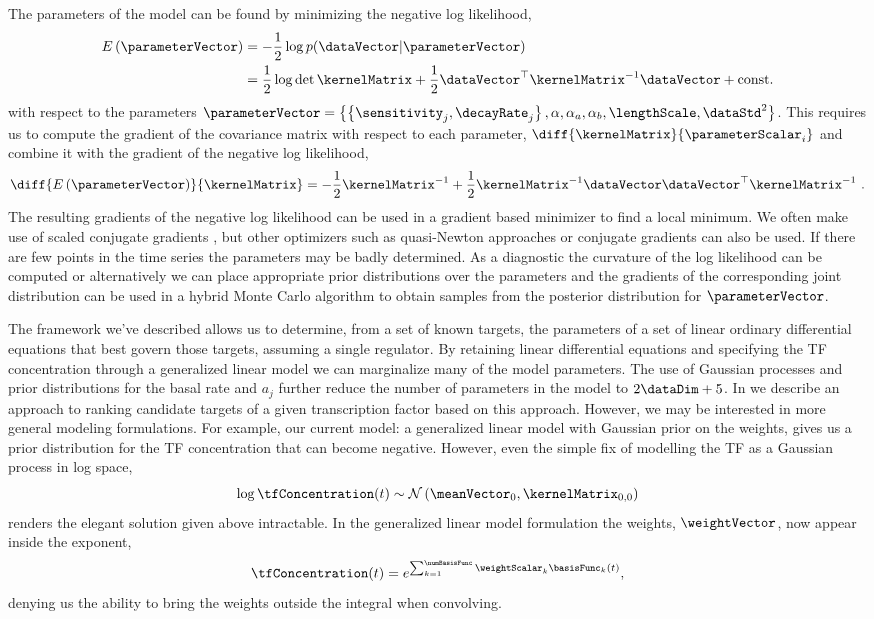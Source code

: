 \documentclass{article}
\begin{document}
The parameters of the model can be found by minimizing the negative log likelihood, 
\begin{align}
E\left(\parameterVector\right)& = -\frac{1}{2}\log p(\dataVector |
\parameterVector)\\ & = \frac{1}{2}\log \det{\kernelMatrix}  +
\frac{1}{2}\dataVector^\top\kernelMatrix^{-1}\dataVector +
\mathrm{const.}
\label{eq:error}
\end{align}
with respect to the parameters $\parameterVector =
\left\{\left\{\sensitivity_j, \decayRate_j\right\}, \alpha,
  \alpha_a, \alpha_b, \lengthScale, \dataStd^2 \right\}$. This
requires us to compute the gradient of the covariance matrix with
respect to each parameter, $\diff{\kernelMatrix}{\parameterScalar_i}$
and combine it with the gradient of the negative log likelihood,
\[
\diff{E\left(\parameterVector\right)}{\kernelMatrix} =
-\frac{1}{2}\kernelMatrix^{-1}  + \frac{1}{2}\kernelMatrix^{-1}
\dataVector\dataVector^\top\kernelMatrix^{-1} \ .
\]
The resulting gradients of the negative log likelihood can be used in
a gradient based minimizer to find a local minimum. We often make use
of scaled conjugate gradients \citep{Moller:scg93}, but other
optimizers such as quasi-Newton approaches \cite[see
e.g.][]{Zhu:lbfgsb97} or conjugate gradients can also be used. If
there are few points in the time series the parameters may be badly
determined. As a diagnostic the curvature of the log likelihood can be
computed or alternatively we can place appropriate prior distributions
over the parameters and the gradients of the corresponding joint
distribution can be used in a hybrid Monte Carlo algorithm \citep[see
e.g.][for details on hybrid Monte Carlo]{MacKay:information03} to obtain samples from the posterior
distribution for $\parameterVector$.

The framework we've described allows us to determine, from a set of
known targets, the parameters of a set of linear ordinary differential
equations that best govern those targets, assuming a single
regulator. By retaining linear differential equations and specifying
the TF concentration through a generalized linear model we can
marginalize many of the model parameters. The use of Gaussian
processes and prior distributions for the basal rate and $a_j$ further
reduce the number of parameters in the model to $2\dataDim + 5$. In
 we describe an approach to ranking
candidate targets of a given transcription factor based on this
approach. However, we may be interested in more general modeling
formulations. For example, our current model: a generalized linear
model with Gaussian prior on the weights, gives us a prior
distribution for the TF concentration that can become
negative. However, even the simple fix of modelling the TF as a
Gaussian process in log space,
\[
\log \tfConcentration(t) \sim \mathcal{N}\left(\meanVector_0, \kernelMatrix_{0,0}\right)
\]
renders the elegant solution given above intractable. In the
generalized linear model formulation the weights, $\weightVector$, now
appear inside the exponent,
\[
\tfConcentration(t)=e^{\sum_{k=1}^\numBasisFunc \weightScalar_k \basisFunc_k(t)},
\]
denying us the ability to bring the weights outside the integral when
convolving.
\end{document}
